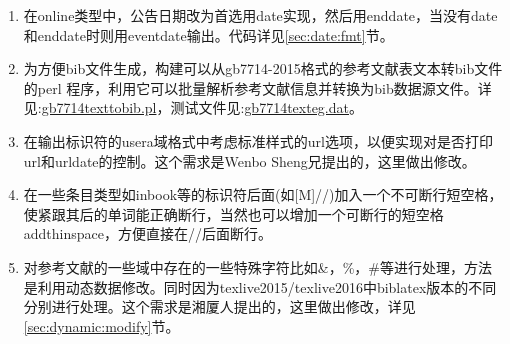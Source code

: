 \begin{enumerate}
\item 在online类型中，公告日期改为首选用date实现，然后用enddate，当没有date 和enddate时则用eventdate输出。代码详见\ref{sec:date:fmt}节。

\item 为方便bib文件生成，构建可以从gb7714-2015格式的参考文献表文本转bib文件的perl 程序，利用它可以批量解析参考文献信息并转换为bib数据源文件。详见:\href{run:./gb7714texttobib.pl}{gb7714texttobib.pl}，测试文件见:\href{run:./gb7714texteg.dat}{gb7714texteg.dat}。

\item 在输出标识符的usera域格式中考虑标准样式的url选项，以便实现对是否打印url和urldate的控制。这个需求是Wenbo Sheng兄提出的，这里做出修改。
    \begin{texlist}


    \end{texlist}

\item 在一些条目类型如inbook等的标识符后面(如[M]//)加入一个不可断行短空格，使紧跟其后的单词能正确断行，当然也可以增加一个可断行的短空格addthinspace，方便直接在//后面断行。
    \begin{texlist}
    \printtext{\texttt{//}\addnbthinspace}%
    \end{texlist}

\item 对参考文献的一些域中存在的一些特殊字符比如\&，\%，\#等进行处理，方法是利用动态数据修改。同时因为texlive2015/texlive2016中biblatex版本的不同分别进行处理。这个需求是湘厦人提出的，这里做出修改，详见\ref{sec:dynamic:modify}节。


\end{enumerate}

